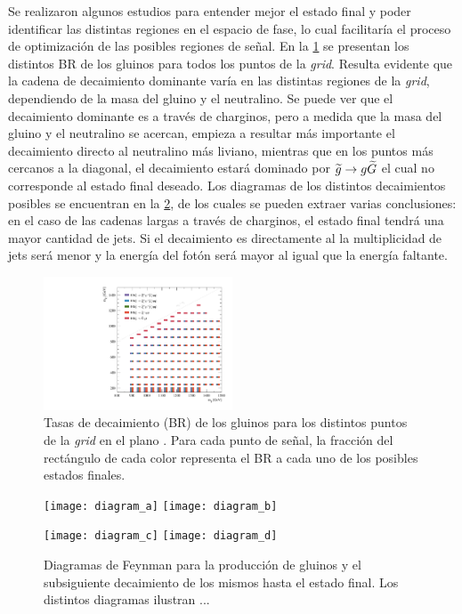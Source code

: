Se realizaron algunos estudios para entender mejor el estado final y poder
identificar las distintas regiones en el espacio de fase, lo cual facilitaría el
proceso de optimización de las posibles regiones de se\~nal. En la
\cref{fig:signal_br_gl} se presentan los distintos BR de los gluinos para todos
los puntos de la \emph{grid}. Resulta evidente que la cadena de decaimiento dominante
varía en las distintas regiones de la \emph{grid}, dependiendo de la masa del gluino y
el neutralino. Se puede ver que el decaimiento dominante es a través de
charginos, pero a medida que la masa del gluino y el neutralino se acercan,
empieza a resultar más importante el decaimiento directo al neutralino más
liviano, mientras que en los puntos más cercanos a la diagonal, el decaimiento
estará dominado por $\widetilde{g}\rightarrow g\widetilde{G}$ el cual no corresponde al estado
final deseado. Los diagramas de los distintos decaimientos posibles se encuentran
en la \cref{fig:signal_diagrams}, de los cuales se pueden extraer varias
conclusiones: en el caso de las cadenas largas a través de charginos, el estado
final tendrá una mayor cantidad de jets. Si el decaimiento es directamente al
{\ninoone} la multiplicidad de jets será menor y la energía del fotón será mayor
al igual que la energía faltante.


\begin{figure}[!htb]
  \centering

  \includegraphics[width=0.5\textwidth]{figures/br_gl_X}

  \caption{Tasas de decaimiento (BR) de los gluinos para los distintos puntos de la \emph{grid} en
    el plano \mgmn. Para cada punto de señal, la fracción del rectángulo de cada color representa
    el BR a cada uno de los posibles estados finales.}
  \label{fig:signal_br_gl}
\end{figure}


\begin{figure}[!htb]
  \centering

  \texttt{[image: diagram\_a]}
  \texttt{[image: diagram\_b]}

  \texttt{[image: diagram\_c]}
  \texttt{[image: diagram\_d]}

  \caption{Diagramas de Feynman para la producción de gluinos y el subsiguiente
    decaimiento de los mismos hasta el estado final. Los distintos diagramas ilustran ... }
  \label{fig:signal_diagrams}

\end{figure}


